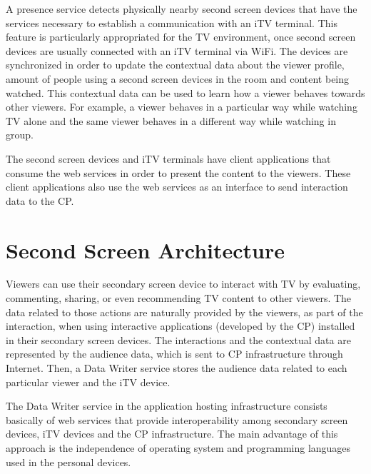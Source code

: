\documentclass[journal]{IEEEtran}
\begin{document}
A presence service detects physically nearby second screen devices that have the services necessary to establish a communication with an iTV terminal. This feature is particularly appropriated for the TV environment, once second screen devices are usually connected with an iTV terminal via WiFi. The devices are synchronized in order to update the contextual data about the viewer profile, amount of people using a second screen devices in the room and content being watched. This contextual data can be used to learn how a viewer behaves towards other viewers. For example, a viewer behaves in a particular way while watching TV alone and the same viewer behaves in a different way while watching in group.

The second screen devices and iTV terminals have client applications that consume the web services in order to present the content to the viewers. These client applications also use the web services as an interface to send interaction data to the CP. 




\section{Second Screen Architecture}


Viewers can use their secondary screen device to interact with TV by evaluating, commenting, sharing, or even recommending TV content to other viewers. The data related to those actions are naturally provided by the viewers, as part of the interaction, when using interactive applications (developed by the CP) installed in their secondary screen devices. The interactions and the contextual data are represented by the audience data, which is sent to CP infrastructure through Internet. Then, a Data Writer service stores the audience data related to each particular viewer and the iTV device.

The Data Writer service in the application hosting infrastructure consists basically of web services that provide interoperability among secondary screen devices, iTV devices and the CP infrastructure. The main advantage of this approach is the independence of operating system and programming languages used in the personal devices.
 
\end{document}
